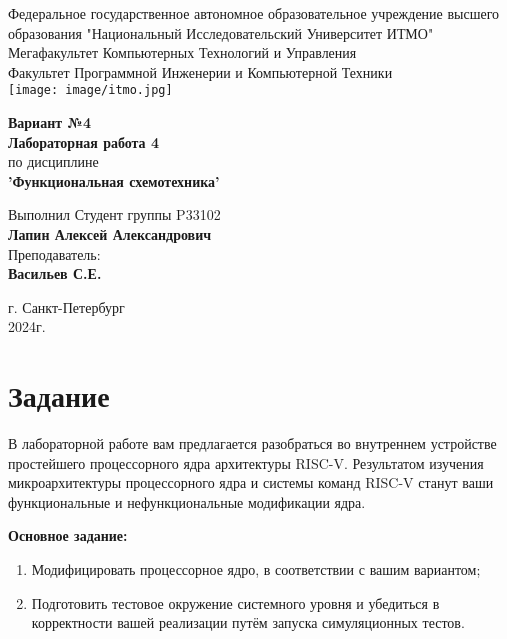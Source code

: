 \documentclass[12pt,onecolumn]{article}
\newcommand{\csection}[1]{
  \addcontentsline{toc}{section}{\textbf{#1}}
  \section*{#1}
  }
\begin{document}
\setcounter{tocdepth}{4}
\begin{center}
  Федеральное государственное автономное образовательное учреждение высшего образования "Национальный Исследовательский Университет ИТМО"\\
  Мегафакультет Компьютерных Технологий и Управления\\
  Факультет Программной Инженерии и Компьютерной Техники \\
  \texttt{[image: image/itmo.jpg]} %
\end{center}
\vspace{1cm}


\begin{center}
  \large \textbf{Вариант №4}\\
  \textbf{Лабораторная работа 4}\\
  по дисциплине\\
  \textbf{'Функциональная схемотехника'}
\end{center}

\vspace{2cm}

\begin{flushright}
  Выполнил Студент  группы P33102\\
  \textbf{Лапин Алексей Александрович}\\
  Преподаватель: \\
  \textbf{Васильев С.Е.}\\
\end{flushright}

\vspace{9cm}
\begin{center}
  г. Санкт-Петербург\\
  2024г.
\end{center}
\pagestyle{empty}

\newpage
\tableofcontents
\newpage
\csection{Задание}
В лабораторной работе вам предлагается разобраться во внутреннем устройстве простейшего процессорного ядра архитектуры RISC-V. Результатом изучения микроархитектуры процессорного ядра и системы команд RISC-V станут ваши функциональные и нефункциональные модификации ядра.

\textbf{Основное задание:}
\begin{enumerate}
  \item Модифицировать процессорное ядро, в соответствии с вашим вариантом;
  \item Подготовить тестовое окружение системного уровня и убедиться в корректности вашей реализации путём запуска симуляционных тестов.
\end{enumerate}
\end{document}
